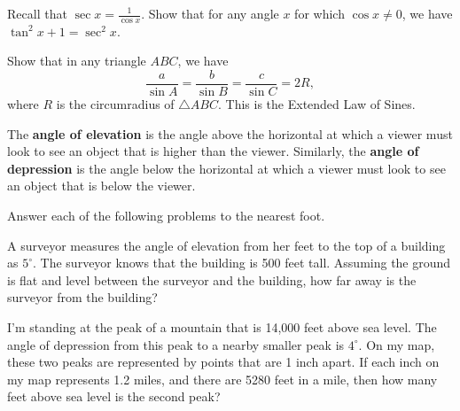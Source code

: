 \documentclass[12pt]{exam}
\begin{document}
\begin{questions}
\newpage

\question[10]
Recall that $\sec x = \frac{1}{\cos x}$. Show that for any angle $x$ for which $\cos x \neq 0$, we have $\tan^2 x + 1 = \sec^2 x$.
\vspace*{5cm}

\question[12]
Show that in any triangle $ABC$, we have
\[ \frac{a}{\sin A} = \frac{b}{\sin B} = \frac{c}{\sin C} = 2R, \]
where $R$ is the circumradius of $\triangle ABC$. This is the Extended Law of Sines.
\vspace*{6cm}

\newpage

\question[16]
The \textbf{angle of elevation} is the angle above the horizontal at which a viewer must look to see an object that is higher than the viewer. Similarly, the \textbf{angle of depression} is the angle below the horizontal at which a viewer must look to see an object that is below the viewer.

\par\addvspace{\baselineskip}
Answer each of the following problems to the nearest foot.
\begin{parts}
    \item A surveyor measures the angle of elevation from her feet to the top of a building as $5^\circ$. The surveyor knows that the building is 500 feet tall. Assuming the ground is flat and level between the surveyor and the building, how far away is the surveyor from the building?
    \vspace*{5cm}

    \item I'm standing at the peak of a mountain that is 14,000 feet above sea level. The angle of depression from this peak to a nearby smaller peak is $4^\circ$. On my map, these two peaks are represented by points that are 1 inch apart. If each inch on my map represents 1.2 miles, and there are 5280 feet in a mile, then how many feet above sea level is the second peak?
    \vspace*{6cm}
\end{parts}

\end{questions}
\end{document}
